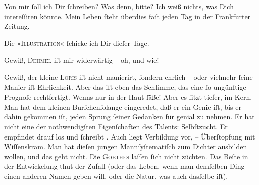 \pstart
           Von mir{ }ſoll ich Dir{ }ſchreiben? Was denn, bitte? Ich weiß {\pb}nichts, was Dich intereſſiren könnte. Mein Leben{ }ſteht überdies faſt jeden Tag in der Frankfurter
                  Zeitung.\pend
           
\pstart
           Die »\textsc{Illustration}«{ }ſchicke ich Dir dieſer Tage.\pend
           
\pstart
           Gewiß, \textsc{Dehmel} iſt mir widerwärtig – oh, und wie!\pend
           
\pstart
           Gewiß, der kleine \textsc{Loris} iſt nicht manierirt, {\pb}ſondern ehrlich – oder
               vielmehr{ }ſeine Manier iſt Ehrlichkeit. Aber das iſt eben das Schlimme, das eine{ }ſo
               ungünſtige  Prognoſe rechtfertigt. \strikeout{\textcolor{gray}{W}} Wenns nur in der Haut{ }ſäße! Aber es{ }ſitzt tiefer, im Kern. Man hat dem kleinen
                  Burſchenſolange
               eingeredet, daß er ein Genie iſt, bis er dahin gekommen iſt, jeden Sprung{ }ſeiner
               Gedanken für genial zu nehmen. {\pb}Er hat nicht eine
               der nothwendigſten Eigenſchaften des Talents: Selbſtzucht. Er empfindet drauf los und{ }ſchreibt \label{K_L02776-5v}\label{K_L02776-5}. Auch
               liegt Verbildung vor, – Überſtopfung mit Wiſſenskram. Man hat dieſen jungen Mannſyſtematiſch zum Dichter
               ausbilden wollen, und das geht nicht. Die \textsc{Goethes} laſſen{ }ſich nicht züchten. Das
               Beſte in der Entwickelung {\pb}thut der Zufall (oder das
               Leben, wenn man demſelben Ding einen anderen Namen geben will, oder die Natur, was
               auch dasſelbe iſt).\pend
           
